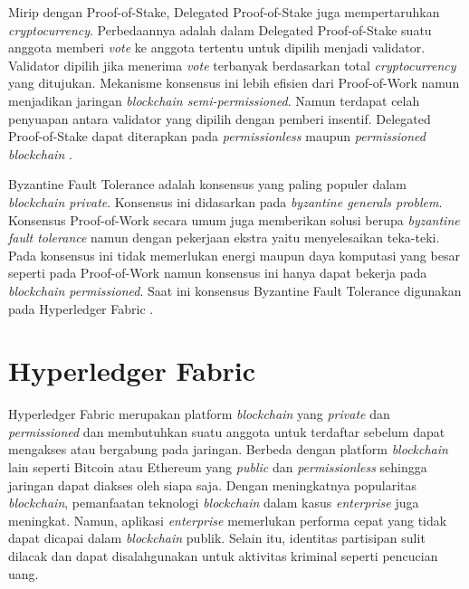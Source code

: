 Mirip dengan Proof-of-Stake, Delegated Proof-of-Stake juga mempertaruhkan \textit{cryptocurrency}. Perbedaannya adalah dalam Delegated Proof-of-Stake suatu anggota memberi \textit{vote} ke anggota tertentu untuk dipilih menjadi validator. Validator dipilih jika menerima \textit{vote} terbanyak berdasarkan total \textit{cryptocurrency} yang ditujukan. Mekanisme konsensus ini lebih efisien dari Proof-of-Work namun menjadikan jaringan \textit{blockchain semi-permissioned}. Namun terdapat celah penyuapan antara validator yang dipilih dengan pemberi insentif. Delegated Proof-of-Stake dapat diterapkan pada \textit{permissionless} maupun \textit{permissioned blockchain} \citep{Ahmed2020} \citep{Yaga2018}.

Byzantine Fault Tolerance adalah konsensus yang paling populer dalam \textit{blockchain private}. Konsensus ini didasarkan pada \textit{byzantine generals problem}. Konsensus Proof-of-Work secara umum juga memberikan solusi berupa \textit{byzantine fault tolerance} namun dengan pekerjaan ekstra yaitu menyelesaikan teka-teki. Pada konsensus ini tidak memerlukan energi maupun daya komputasi yang besar seperti pada Proof-of-Work namun konsensus ini hanya dapat bekerja pada \textit{blockchain permissioned}. Saat ini konsensus Byzantine Fault Tolerance digunakan pada Hyperledger Fabric \citep{Ahmed2020}.

\section{Hyperledger Fabric}
\label{sec:hypefabric}

Hyperledger Fabric \citep{Androulaki2018} merupakan platform \textit{blockchain} yang \textit{private} dan \textit{permissioned} dan membutuhkan suatu anggota untuk terdaftar sebelum dapat mengakses atau bergabung pada jaringan. Berbeda dengan platform \textit{blockchain} lain seperti Bitcoin atau Ethereum yang \textit{public} dan \textit{permissionless} sehingga jaringan dapat diakses oleh siapa saja. Dengan meningkatnya popularitas \textit{blockchain}, pemanfaatan teknologi \textit{blockchain} dalam kasus \textit{enterprise} juga meningkat. Namun, aplikasi \textit{enterprise} memerlukan performa cepat yang tidak dapat dicapai dalam \textit{blockchain} publik. Selain itu, identitas partisipan sulit dilacak dan dapat disalahgunakan untuk aktivitas kriminal seperti pencucian uang.

